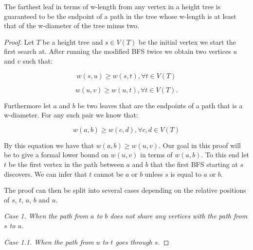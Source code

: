 
\begin{lem} The farthest leaf in terms of w-length from any vertex in a height tree is guaranteed to be the endpoint of a path in the tree whose w-length is at least that of the w-diameter of the tree minus two. \end{lem}



\begin{proof}
Let $T$ be a height tree and $s \in V(T)$ be the initial vertex we start the first search at. After running the modified BFS twice we obtain two vertices $u$ and $v$ such that:

\begin{equation}
    \label{eq:su_all}
    w(s, u) \ge w(s, t), \forall t \in V(T)
\end{equation}

\begin{equation}
    \label{eq:uv_all}
    w(u, v) \ge w(u, t), \forall t \in V(T).
\end{equation}

Furthermore let $a$ and $b$ be two leaves that are the endpoints of a path that is a w-diameter. For any such pair we know that:

\begin{equation}
    \label{eq:ab_all}
    w(a, b) \ge w(c, d), \forall c, d \in V(T)
\end{equation}

By this equation we have that $w(a, b) \ge w(u, v)$. Our goal in this proof will be to give a formal lower bound on $w(u, v)$ in terms of $w(a, b)$. To this end let $t$ be the first vertex in the path between $a$ and $b$ that the first BFS starting at $s$ discovers. We can infer that $t$ cannot be $a$ or $b$ unless $s$ is equal to $a$ or $b$.

The proof can then be split into several cases depending on the relative positions of $s$, $t$, $a$, $b$ and $u$. \linebreak

{\em Case 1. When the path from $a$ to $b$ does not share any vertices with the path from $s$ to $u$.}

{\em Case 1.1. When the path from $u$ to $t$ goes through $s$.}




\end{proof}
